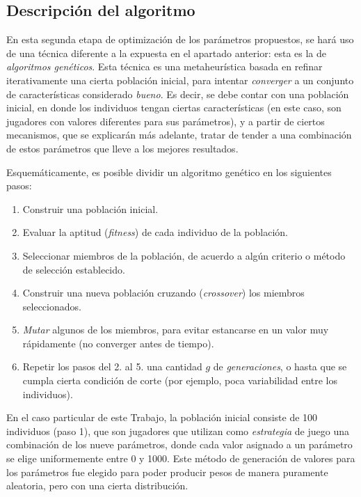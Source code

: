 \documentclass[12pt,a4paper]{article}
\begin{document}
    \subsection{Descripción del algoritmo}
    
    En esta segunda etapa de optimización de los parámetros propuestos, se hará uso de una técnica diferente a la expuesta en el apartado anterior: esta es la de \textit{algoritmos genéticos}. Esta técnica es una metaheurística basada en refinar iterativamente una cierta población inicial, para intentar \textit{converger} a un conjunto de características considerado \textit{bueno}. Es decir, se debe contar con una población inicial, en donde los individuos tengan ciertas características (en este caso, son jugadores con valores diferentes para sus parámetros), y a partir de ciertos mecanismos, que se explicarán más adelante, tratar de tender a una combinación de estos parámetros que lleve a los mejores resultados.
    
    Esquemáticamente, es posible dividir un algoritmo genético en los siguientes pasos:
        \begin{enumerate}
            \item Construir una población inicial.
            \item Evaluar la aptitud (\textit{fitness}) de cada individuo de la población.
            \item Seleccionar miembros de la población, de acuerdo a algún criterio o método de selección establecido.
            \item Construir una nueva población cruzando (\textit{crossover}) los miembros seleccionados.
            \item \textit{Mutar} algunos de los miembros, para evitar estancarse en un valor muy rápidamente (no converger antes de tiempo).
            \item Repetir los pasos del 2. al 5. una cantidad $g$ de \textit{generaciones}, o hasta que se cumpla cierta condición de corte (por ejemplo, poca variabilidad entre los individuos).
        \end{enumerate}
        
    En el caso particular de este Trabajo, la población inicial consiste de 100 individuos (paso 1), que son jugadores que utilizan como \textit{estrategia} de juego una combinación de los nueve parámetros, donde cada valor asignado a un parámetro se elige uniformemente entre 0 y 1000. Este método de generación de valores para los parámetros fue elegido para poder producir pesos de manera puramente aleatoria, pero con una cierta distribución. 
    
\end{document}
